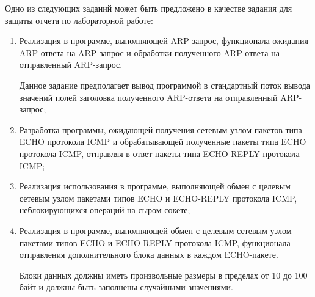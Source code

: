 
Одно из следующих заданий может быть предложено в качестве задания для защиты отчета по лабораторной работе:

\begin{enumerate}

	\item Реализация в программе, выполняющей ARP-запрос, функционала ожидания ARP-ответа на ARP-запрос и
	обработки полученного ARP-ответа на отправленный ARP-запрос.

		Данное задание предполагает вывод программой в стандартный поток вывода значений полей заголовка полученного
		ARP-ответа на отправленный ARP-запрос;

	\item Разработка программы, ожидающей получения сетевым узлом пакетов типа ECHO протокола ICMP
	и обрабатывающей полученные пакеты типа ECHO протокола ICMP, отправляя в ответ пакеты типа ECHO-REPLY
	протокола ICMP;

	\item Реализация использования в программе, выполняющей обмен с целевым сетевым узлом пакетами типов ECHO и ECHO-REPLY протокола
	ICMP, неблокирующихся операций на сыром сокете;

	\item Реализация в программе, выполняющей обмен с целевым сетевым узлом пакетами типов ECHO и ECHO-REPLY протокола
	ICMP, функционала отправления дополнительного блока данных в каждом ECHO-пакете.

		Блоки данных должны иметь произвольные размеры в пределах от 10 до 100 байт и должны быть заполнены случайными
		значениями.

\end{enumerate}

